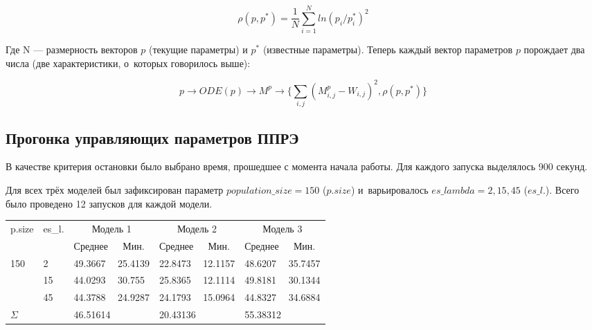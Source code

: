\[ \rho(p,p^*) = \frac{1}{N} \sum\limits_{i = 1}^{N} ln(p_i/p^*_i)^2 \]

Где N — размерность векторов $p$ (текущие параметры) и $p^*$ (известные 
параметры). Теперь каждый вектор параметров $p$ порождает два числа (две 
характеристики, о~которых говорилось выше):

\[ 
p \rightarrow ODE(p) \rightarrow M^p 
\rightarrow \{ \sum\limits_{i,j}(M_{i,j}^p - W_{i,j})^2 , \rho(p,p^*) \}
\]

\subsection{Прогонка управляющих параметров ППРЭ} \label{s3_2}

В качестве критерия остановки было выбрано время, прошедшее с момента начала 
работы. Для каждого запуска выделялось 900 секунд. 

Для всех трёх моделей был зафиксирован параметр $population\_size = 150$ 
($p.size$) и~варьировалось $es\_lambda = 2,15,45$ ($es\_l.$). Всего было 
проведено 12 запусков для каждой модели. 

\begin{table}[h]
\centering
\def\arraystretch{1.5} %
\begin{tabular}{|l|l|llllll|}
\hline %
  \multirow{2}{*}{p.size} & 
  \multirow{2}{*}{es\_l.} & 
  \multicolumn{2}{c|}{Модель 1} & 
  \multicolumn{2}{c|}{Модель 2} & 
  \multicolumn{2}{c|}{Модель 3} \\ \cline{3-8} 
  & & 
  \multicolumn{1}{c|}{Среднее} & 
  \multicolumn{1}{c|}{Мин.} & 
  \multicolumn{1}{c|}{Среднее} & 
  \multicolumn{1}{c|}{Мин.} & 
  \multicolumn{1}{c|}{Среднее} & 
  \multicolumn{1}{c|}{Мин.} \\ 

\hline %
\multirow{3}{*}{150} 
 & 2  & 49.3667 & 25.4139 & 22.8473 & 12.1157 & 48.6207 & 35.7457 \\ \cline{2-2}
 & 15 & 44.0293 & 30.755  & 25.8365 & 12.1114 & 49.8181 & 30.1344 \\ \cline{2-2}
 & 45 & 44.3788 & 24.9287 & 24.1793 & 15.0964 & 44.8327 & 34.6884 \\ 

\hline %
\multicolumn{2}{|l|}{$\Sigma$} & 
\multicolumn{2}{l|}{46.51614} & 
\multicolumn{2}{l|}{20.43136} & 
\multicolumn{2}{l|}{55.38312} \\ 

\hline %
\end{tabular}
\end{table}


